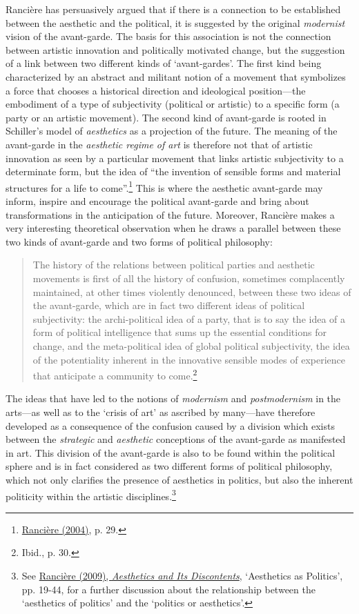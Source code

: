 Ranci\`{e}re has persuasively argued that if there is a connection to be established between the aesthetic and the political, it is suggested by the original \emph{modernist} vision of the avant-garde.  The basis for this association is not the connection between artistic innovation and politically motivated change, but the suggestion of a link between two different kinds of `avant-gardes'. The first kind being characterized by an abstract and militant notion of a movement that symbolizes a force that chooses a historical direction and ideological position---the embodiment of a type of subjectivity (political or artistic) to a specific form (a party or an artistic movement). The second kind of avant-garde is rooted in Schiller's model of \emph{aesthetics} as a projection of the future. The meaning of the avant-garde in the \emph{aesthetic regime of art} is therefore not that of artistic innovation as seen by a particular movement that links artistic subjectivity to a determinate form, but the idea of ``the invention of sensible forms and material structures for a life to come''.\footnote{\hyperlink{ranpoli}{Ranci\`{e}re (2004)}, p. 29.} This is where the aesthetic avant-garde may inform, inspire and encourage the political avant-garde and bring about transformations in the anticipation of the future. Moreover, Ranci\`{e}re makes a very interesting theoretical observation when he draws a parallel between these two kinds of avant-garde and two forms of political philosophy:
\begin{quote}
The history of the relations between political parties and aesthetic movements is first of all the history of confusion, sometimes complacently maintained, at other times violently denounced, between these two ideas of the avant-garde, which are in fact two different ideas of political subjectivity: the archi-political idea of a party, that is to say the idea of a form of political intelligence that sums up the essential conditions for change, and the meta-political idea of global political subjectivity, the idea of the potentiality inherent in the innovative sensible modes of experience that anticipate a community to come.\footnote{Ibid., p. 30.}
\end{quote}

The ideas that have led to the notions of \emph{modernism} and \emph{postmodernism} in the arts---as well as to the `crisis of art' as ascribed by many---have therefore developed as a consequence of the confusion caused by a division which exists between the \emph{strategic} and \emph{aesthetic} conceptions of the avant-garde as manifested in art. This division of the avant-garde is also to be found within the political sphere and is in fact considered as two different forms of political philosophy, which not only clarifies the presence of aesthetics in politics, but also the inherent politicity within the artistic disciplines.\footnote{See \hyperlink{ranaesth}{Ranci\`{e}re (2009), \emph{Aesthetics and Its Discontents}}, `Aesthetics as Politics', pp. 19-44, for a further discussion about the relationship between the `aesthetics of politics' and the `politics or aesthetics'.}

